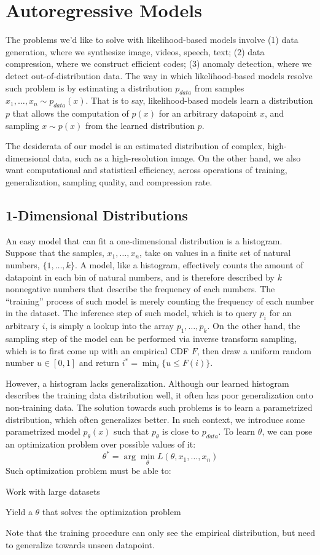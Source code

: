 \chapter{Autoregressive Models}
The problems we'd like to solve with likelihood-based models involve (1) data generation, where we synthesize image, videos, speech, text; (2) data compression, where we construct efficient codes; (3) anomaly detection, where we detect out-of-distribution data.
The way in which likelihood-based models resolve such problem is by estimating a distribution $p_{data}$ from samples $x_1, \dots, x_n \sim p_{data}(x)$.
That is to say, likelihood-based models learn a distribution $p$ that allows the computation of $p(x)$ for an arbitrary datapoint $x$, and sampling $x \sim p(x)$ from the learned distribution $p$.

The desiderata of our model is an estimated distribution of complex, high-dimensional data, such as a high-resolution image.
On the other hand, we also want computational and statistical efficiency, across operations of training, generalization, sampling quality, and compression rate.

\section{1-Dimensional Distributions}
An easy model that can fit a one-dimensional distribution is a histogram.
Suppose that the samples, $x_1, \dots, x_n$, take on values in a finite set of natural numbers, $\{1, \dots, k\}$.
A model, like a histogram, effectively counts the amount of datapoint in each bin of natural numbers, and is therefore described by $k$ nonnegative numbers that describe the frequency of each numbers.
The ``training'' process of such model is merely counting the frequency of each number in the dataset.
The inference step of such model, which is to query $p_i$ for an arbitrary $i$, is simply a lookup into the array $p_1, \dots, p_k$.
On the other hand, the sampling step of the model can be performed via inverse transform sampling, which is to first come up with an empirical CDF $F$, then draw a uniform random number $u \in [0, 1]$ and return $i^* = \min_i \{u \leq F(i)\}$.

However, a histogram lacks generalization. Although our learned histogram describes the training data distribution well, it often has poor generalization onto non-training data.
The solution towards such problems is to learn a parametrized distribution, which often generalizes better.
In such context, we introduce some parametrized model $p_\theta(x)$ such that $p_\theta$ is close to $p_{data}$.
To learn $\theta$, we can pose an optimization problem over possible values of it:
\[
    \theta^* = \arg \min_\theta L(\theta, x_1, \dots, x_n)
\]
Such optimization problem must be able to:
\begin{bindenum}
    \item Work with large datasets
    \item Yield a $\theta$ that solves the optimization problem
    \item Note that the training procedure can only see the empirical distribution, but need to generalize towards unseen datapoint.
\end{bindenum}

